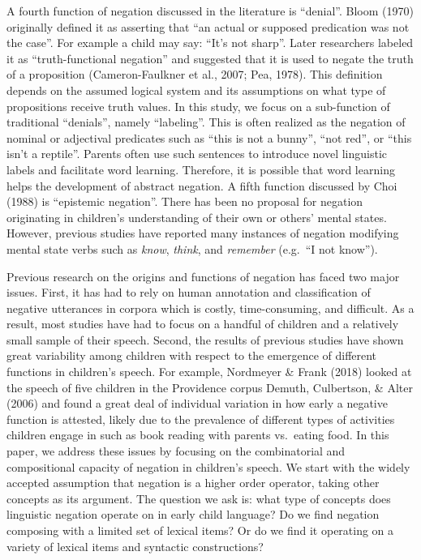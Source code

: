 \documentclass[10pt, letterpaper]{article}
\begin{document}
A fourth function of negation discussed in the literature is ``denial''.
Bloom (1970) originally defined it as asserting that ``an actual or
supposed predication was not the case''. For example a child may say:
``It's not sharp''. Later researchers labeled it as ``truth-functional
negation'' and suggested that it is used to negate the truth of a
proposition (Cameron-Faulkner et al., 2007; Pea, 1978). This definition
depends on the assumed logical system and its assumptions on what type
of propositions receive truth values. In this study, we focus on a
sub-function of traditional ``denials'', namely ``labeling''. This is
often realized as the negation of nominal or adjectival predicates such
as ``this is not a bunny'', ``not red'', or ``this isn't a reptile''.
Parents often use such sentences to introduce novel linguistic labels
and facilitate word learning. Therefore, it is possible that word
learning helps the development of abstract negation. A fifth function
discussed by Choi (1988) is ``epistemic negation''. There has been no
proposal for negation originating in children's understanding of their
own or others' mental states. However, previous studies have reported
many instances of negation modifying mental state verbs such as
\emph{know}, \emph{think}, and \emph{remember} (e.g.~``I not know'').

Previous research on the origins and functions of negation has faced two
major issues. First, it has had to rely on human annotation and
classification of negative utterances in corpora which is costly,
time-consuming, and difficult. As a result, most studies have had to
focus on a handful of children and a relatively small sample of their
speech. Second, the results of previous studies have shown great
variability among children with respect to the emergence of different
functions in children's speech. For example, Nordmeyer \& Frank (2018)
looked at the speech of five children in the Providence corpus Demuth,
Culbertson, \& Alter (2006) and found a great deal of individual
variation in how early a negative function is attested, likely due to
the prevalence of different types of activities children engage in such
as book reading with parents vs.~eating food. In this paper, we address
these issues by focusing on the combinatorial and compositional capacity
of negation in children's speech. We start with the widely accepted
assumption that negation is a higher order operator, taking other
concepts as its argument. The question we ask is: what type of concepts
does linguistic negation operate on in early child language? Do we find
negation composing with a limited set of lexical items? Or do we find it
operating on a variety of lexical items and syntactic constructions?
\end{document}
